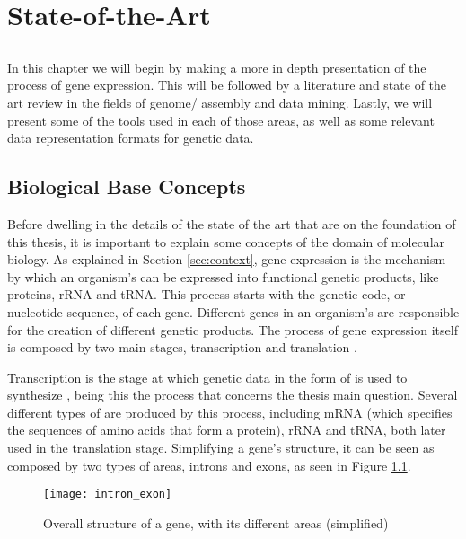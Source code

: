 \chapter{State-of-the-Art} \label{chap:sota}

\section*{}

In this chapter we will begin by making a more in depth presentation of the
process of gene expression. This will be followed by a literature and state of
the art review in the fields of genome/\trans{} assembly and data mining.
Lastly, we will present some of the tools used in each of those areas, as well
as some relevant data representation formats for genetic data.

\section{Biological Base Concepts}

Before dwelling in the details of the state of the art that are on the
foundation of this thesis, it is important to explain some concepts of the
domain of molecular biology. As explained in Section \ref{sec:context}, gene
expression is the mechanism by which an organism's \dna{} can be expressed into
functional genetic products, like proteins, rRNA and tRNA. This process starts
with the genetic code, or nucleotide sequence, of each gene. Different genes in
an organism's \dna{} are responsible for the creation of different genetic
products. The process of gene expression itself is composed by two main stages,
transcription and translation \cite{leic:gene_expr}.

Transcription is the stage at which genetic data in the form of \dna{} is used
to synthesize \rna{}, being this the process that concerns the thesis main
question. Several different types of \rna{} are produced by this process,
including mRNA (which specifies the sequences of amino acids that form a
protein), rRNA and tRNA, both later used in the translation stage. Simplifying a
gene's structure, it can be seen as composed by two types of areas, introns and
exons, as seen in Figure \ref{fig:intron_exon}.

\begin{figure}[!htb]
  \begin{center}
    \leavevmode
    \texttt{[image: intron\_exon]}
    \caption{Overall structure of a gene, with its different areas (simplified)}
    \label{fig:intron_exon}
  \end{center}
\end{figure}

